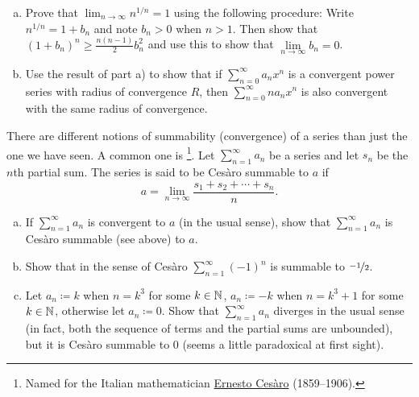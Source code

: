 \begin{samepage}
\begin{exercise}
\leavevmode
\begin{enumerate}[a)]
\item
Prove that $\lim_{n\to\infty} n^{1/n} = 1$ using the following procedure:  Write $n^{1/n} = 1+b_n$ and
note $b_n > 0$ when $n > 1$.  Then show that ${(1+b_n)}^n \geq 
\frac{n(n-1)}{2}b_n^2$ and use this to show that $\lim\limits_{n\to\infty} b_n = 0$.
\item
Use the result of part a) to show that
if $\sum_{n=0}^\infty a_n x^n$ is a convergent power series with radius of convergence $R$,
then $\sum_{n=0}^\infty n a_n x^n$ is also convergent with the same radius of convergence.
\end{enumerate}
\end{exercise}
\end{samepage}

\begin{exnote}
There are different notions of summability (convergence)
of a series
than just the one we have seen.
A common one is \emph{}%
\footnote{Named for the Italian mathematician
\href{https://en.wikipedia.org/wiki/Ernesto_Ces\%C3\%A0ro}{Ernesto Ces\`aro}
(1859--1906).}.  Let $\sum_{n=1}^\infty a_n$ be a series
and let $s_n$ be the $n$th partial sum.  The series is said to
be Ces\`aro summable to $a$ if
\begin{equation*}
a = \lim_{n\to \infty} \frac{s_1 + s_2 + \cdots + s_n}{n} .
\end{equation*}
\end{exnote}

\begin{exercise}[Challenging]
\pagebreak[2]
\leavevmode
\begin{enumerate}[a)]
\item
If $\sum_{n=1}^\infty a_n$ is convergent to $a$ (in the usual sense), show that
$\sum_{n=1}^\infty a_n$ is Ces\`aro summable (see above) to $a$.
\item
Show that in the sense of Ces\`aro $\sum_{n=1}^\infty {(-1)}^n$ is summable to
$\nicefrac{-1}{2}$.
\item
Let $a_n \coloneqq k$ when $n = k^3$ for some $k \in {\mathbb{N}}$,
$a_n \coloneqq -k$ when $n = k^3+1$ for some $k \in {\mathbb{N}}$,
otherwise
let $a_n \coloneqq 0$.  Show that $\sum_{n=1}^\infty a_n$ diverges in the usual sense
(in fact, both the sequence of terms and the partial sums are unbounded), but it is
Ces\`aro summable to 0 (seems a little paradoxical at first sight).
\end{enumerate}
\end{exercise}

